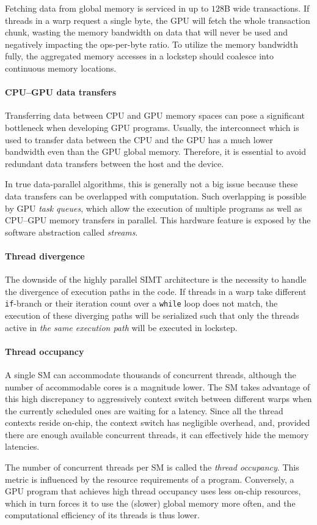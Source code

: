 Fetching data from global memory is serviced in up to $128$B wide transactions. If threads in a warp request a single byte, the GPU will fetch the whole transaction chunk, wasting the memory bandwidth on data that will never be used and negatively impacting the ops-per-byte ratio. To utilize the memory bandwidth fully, the aggregated memory accesses in a lockstep should coalesce into continuous memory locations.

\paragraph{CPU--GPU data transfers}
\label{sec:transfers}

Transferring data between CPU and GPU memory spaces can pose a significant bottleneck when developing GPU programs. Usually, the interconnect which is used to transfer data between the CPU and the GPU has a much lower bandwidth even than the GPU global memory. Therefore, it is essential to avoid redundant data transfers between the host and the device.

In true data-parallel algorithms, this is generally not a big issue because these data transfers can be overlapped with computation. Such overlapping is possible by GPU \emph{task queues}, which allow the execution of multiple programs as well as CPU--GPU memory transfers in parallel. This hardware feature is exposed by the software abstraction called \emph{streams}.

\paragraph{Thread divergence}
\label{sec:divergence}

The downside of the highly parallel SIMT architecture is the necessity to handle the divergence of execution paths in the code.
If threads in a warp take different \texttt{if}-branch or their iteration count over a \texttt{while} loop does not match, the execution of these diverging paths will be serialized such that only the threads active in \emph{the same execution path} will be executed in lockstep.

\paragraph{Thread occupancy}
\label{sec:occupancy}

A single SM can accommodate thousands of concurrent threads, although the number of accommodable cores is a magnitude lower. The SM takes advantage of this high discrepancy to aggressively context switch between different warps when the currently scheduled ones are waiting for a latency. Since all the thread contexts reside on-chip, the context switch has negligible overhead, and, provided there are enough available concurrent threads, it can effectively hide the memory latencies.

The number of concurrent threads per SM is called the \emph{thread occupancy}. This metric is influenced by the resource requirements of a program. Conversely, a GPU program that achieves high thread occupancy uses less on-chip resources, which in turn forces it to use the (slower) global memory more often, and the computational efficiency of its threads is thus lower.
